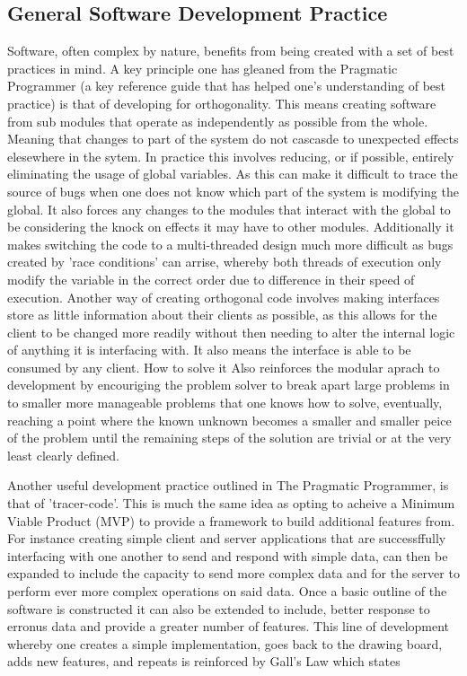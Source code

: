   \subsection{General Software Development Practice}
    Software, often complex by nature, benefits from being created with a set of best practices in mind. A key principle one has gleaned from the Pragmatic Programmer \cite{hunt2000pragmatic} (a key reference guide that has helped one's understanding of best practice) is that of developing for orthogonality. This means creating software from sub modules that operate as independently as possible from the whole. Meaning that changes to part of the system do not cascasde to unexpected effects elesewhere in the sytem. In practice this involves reducing, or if possible, entirely eliminating the usage of global variables. As this can make it difficult to trace the source of bugs when one does not know which part of the system is modifying the global. It also forces any changes to the modules that interact with the global to be considering the knock on effects it may have to other modules. Additionally it makes switching the code to a multi-threaded design much more difficult as bugs created by 'race conditions' can arrise, whereby both threads of execution only modify the variable in the correct order due to difference in their speed of execution. Another way of creating orthogonal code involves making interfaces store as little information about their clients as possible, as this allows for the client to be changed more readily without then needing to alter the internal logic of anything it is interfacing with. It also means the interface is able to be consumed by any client. How to solve it \cite{G.Polya1945} Also reinforces the modular aprach to development by encouriging the problem solver to break apart large problems in to smaller more manageable problems that one knows how to solve, eventually, reaching a point where the known unknown becomes a smaller and smaller peice of the problem until the remaining steps of the solution are trivial or at the very least clearly defined.
    \par
    Another useful development practice outlined in The Pragmatic Programmer, is that of 'tracer-code'. This is much the same idea as opting to acheive a Minimum Viable Product (MVP) to provide a framework to build additional features from. For instance creating simple client and server applications that are successffully interfacing with one another to send and respond with simple data, can then be expanded to include the capacity to send more complex data and for the server to perform ever more complex operations on said data. Once a basic outline of the software is constructed it can also be extended to include, better response to erronus data and provide a greater number of features. This line of development whereby one creates a simple implementation, goes back to the drawing board, adds new features, and repeats is reinforced by Gall's Law which states  \cite{Gall1977}
